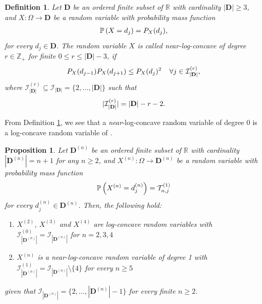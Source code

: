 \documentclass[a4paper,12pt]{article}
\newtheorem{defn}[thm]{Definition}
\newtheorem{prop}[thm]{Proposition}
\def\R{\mathbb{R}}
\def\P{\mathbb{P}}
\def\Z{\mathbb{Z}}
\def\T{\mathcal{T}}
\begin{document}
\begin{defn}
\label{nearlogconcaverandomvariable}
Let $\mathbf{D}$ be an ordered finite subset of $\R$ with cardinality $|\mathbf{D}|\geq 3$, and $X : \Omega \rightarrow \mathbf{D}$ be a random variable with probability mass function 
\begin{align}
\P\left(X = d_j\right) = P_{X}(d_j), \notag 
\end{align}
for every $d_j \in \mathbf{D}$. The random variable $X$ is called \emph{near}-log-concave of degree $r\in \Z_+$ for finite $0 \leq r \leq |\mathbf{D}|-3$, if 
\begin{align} 
P_{X}(d_{j-1})P_{X}(d_{j+1}) \leq P_{X}(d_j)^2 \hspace{0.15in} \text{$\forall j\in\mathcal{I}_{|\mathbf{D}|}^{(r)}$}, \notag
\end{align}
where $\mathcal{I}_{|\mathbf{D}|}^{(r)} \subseteq \mathcal{I}_{|\mathbf{D}|} = \{2,\ldots,|\mathbf{D}|\}$ such that 
\begin{align}
|\mathcal{I}_{|\mathbf{D}|}^{(r)}| = |\mathbf{D}| - r - 2. \notag
\end{align}
\end{defn}
From Definition \ref{nearlogconcaverandomvariable}, we see that a \emph{near}-log-concave random variable of degree 0 is a log-concave random variable of \cite{1,6a}. 
\begin{prop}
\label{nearlogconcaverandomvariableprop}
Let $\mathbf{D}^{(n)}$ be an ordered finite subset of $\R$ with cardinality $|\mathbf{D}^{(n)}| = n+1$ for any $n \geq 2$, and $X^{(n)} : \Omega \rightarrow \mathbf{D}^{(n)}$ be a random variable with probability mass function
\begin{align}
\P\left(X^{(n)} = d^{(n)}_j\right) = \T^{(1)}_{n,j} \notag
\end{align}
for every $d^{(n)}_j \in \mathbf{D}^{(n)}$. Then, the following hold:
\begin{enumerate}
\item $X^{(2)}$, $X^{(3)}$ and $X^{(4)}$ are log-concave random variables with $\mathcal{I}_{|\mathbf{D}^{(n)}|}^{(0)} = \mathcal{I}_{|\mathbf{D}^{(n)}|}$ for $n=2,3,4$
\item $X^{(n)}$ is a \emph{near}-log-concave random variable of degree \emph{1} with $\mathcal{I}_{|\mathbf{D}^{(n)}|}^{(1)} = \mathcal{I}_{|\mathbf{D}^{(n)}|}\setminus\{4\}$ for every $n\geq 5$
\end{enumerate}
given that $\mathcal{I}_{|\mathbf{D}^{(n)}|} = \{2,\ldots,|\mathbf{D}^{(n)}|-1\}$ for every finite $n\geq 2$.
\end{prop}
\end{document}
